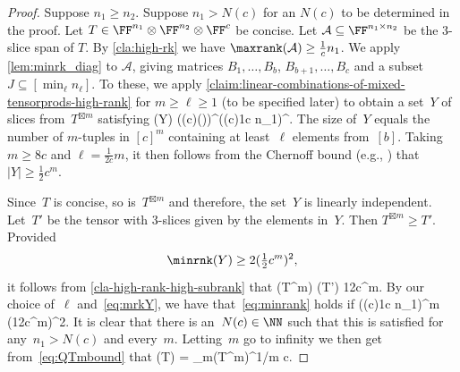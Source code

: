 \begin{proof}%
Suppose $n_1 \geq n_2$. Suppose $n_1 > N(c)$ for an $N(c)$ to be determined in the proof.
Let $T \in \FF^{n_1} \otimes \FF^{n_2} \otimes \FF^{c}$ be concise.
Let $\mathcal{A} \subseteq \FF^{n_1 \times n_2}$ be the 3-slice span of $T$.
By \autoref{cla:high-rk} we have %
$\maxrank(\mathcal{A}) \geq \frac{1}{c} n_1$.
We apply \autoref{lem:minrk_diag} to $\mathcal{A}$, giving matrices $B_1, \ldots, B_b$, $B_{b+1}, \ldots, B_c$ and a subset $J \subseteq [\min_\ell n_\ell]$.
To these, we apply \autoref{claim:linear-combinations-of-mixed-tensorprods-high-rank} for $m \geq \ell \geq 1$ (to be specified later) 
to obtain a set~$Y$ of slices from~$T^{\boxtimes m}$
satisfying
\beq\label{eq:mrkY}
\minrank(Y) \geq \big(\eps(c)\maxrank()\big)^\ell \geq (\eps(c)\tfrac1c n_1)^{\ell}. %
\eeq
The size of~$Y$ equals the number of $m$-tuples in $[c]^m$ containing at least~$\ell$ elements from~$[b]$.
Taking $m \geq 8c$ and $\ell = \tfrac{1}{2c} m$, it then follows from the Chernoff bound (e.g., \cite[Equation~(7)]{MR1045520}) that~$|Y|\geq \tfrac12c^m$.

Since~$T$ is concise, so is~$T^{\boxtimes m}$ and therefore, the set~$Y$ is linearly independent.
Let~$T'$ be the tensor with 3-slices given by the elements in~$Y$.
Then $T^{\boxtimes m} \geq T'$.
Provided
\begin{equation}\label{eq:minrank}
\minrnk(Y) \geq 2(\tfrac12c^{m})^2,
\end{equation}
it follows from \autoref{cla-high-rank-high-subrank} that
\beq\label{eq:QTmbound}
\subrank(T^{\boxtimes m}) \geq \subrank(T') \geq \tfrac12c^m.
\eeq
By our choice of~$\ell$ and~\eqref{eq:mrkY}, we have that~\eqref{eq:minrank} holds if
\beqn
\big(\eps(c)\tfrac1c n_1\big)^{m}
(\tfrac12c^{m})^2.
\eeqn
It is clear that there is an~$N(c)\in\NN$ such that this is satisfied for any~$n_1>N(c)$ and every~$m$.
Letting~$m$ go to infinity we then get from~\eqref{eq:QTmbound} that 
\beqn
\asympsubrank(T) = \lim_{m\to \infty}\subrank(T^{\boxtimes m})^{1/m} \geq c.\qedhere
\eeqn
\end{proof}
